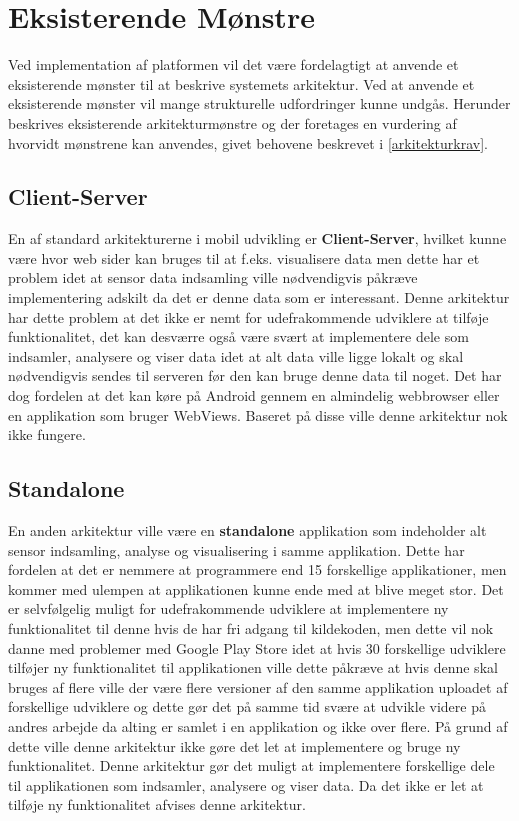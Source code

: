 \section{Eksisterende Mønstre}
Ved implementation af platformen vil det være fordelagtigt at anvende et eksisterende mønster til at beskrive systemets arkitektur.
Ved at anvende et eksisterende mønster vil mange strukturelle udfordringer kunne undgås.
Herunder beskrives eksisterende arkitekturmønstre og der foretages en vurdering af hvorvidt mønstrene kan anvendes, givet behovene beskrevet i \cref{arkitekturkrav}.

\subsection{Client-Server}
En af standard arkitekturerne i mobil udvikling er \textbf{Client-Server}, hvilket kunne være hvor web sider kan bruges til at f.eks. visualisere data men dette har et problem idet at sensor data indsamling ville nødvendigvis påkræve implementering adskilt da det er denne data som er interessant.
Denne arkitektur har dette problem at det ikke er nemt for udefrakommende udviklere at tilføje funktionalitet, det kan desværre også være svært at implementere dele som indsamler, analysere og viser data idet at alt data ville ligge lokalt og skal nødvendigvis sendes til serveren før den kan bruge denne data til noget. 
Det har dog fordelen at det kan køre på Android gennem en almindelig webbrowser eller en applikation som bruger WebViews.
Baseret på disse ville denne arkitektur nok ikke fungere.
\subsection{Standalone}
En anden arkitektur ville være en \textbf{standalone} applikation som indeholder alt sensor indsamling, analyse og visualisering i samme applikation.
Dette har fordelen at det er nemmere at programmere end 15 forskellige applikationer, men kommer med ulempen at applikationen kunne ende med at blive meget stor.
Det er selvfølgelig muligt for udefrakommende udviklere at implementere ny funktionalitet til denne hvis de har fri adgang til kildekoden, men dette vil nok danne med problemer med Google Play Store idet at hvis 30 forskellige udviklere tilføjer ny funktionalitet til applikationen ville dette påkræve at hvis denne skal bruges af flere ville der være flere versioner af den samme applikation uploadet af forskellige udviklere og dette gør det på samme tid svære at udvikle videre på andres arbejde da alting er samlet i en applikation og ikke over flere.
På grund af dette ville denne arkitektur ikke gøre det let at implementere og bruge ny funktionalitet.
Denne arkitektur gør det muligt at implementere forskellige dele til applikationen som indsamler, analysere og viser data.
Da det ikke er let at tilføje ny funktionalitet afvises denne arkitektur. 


